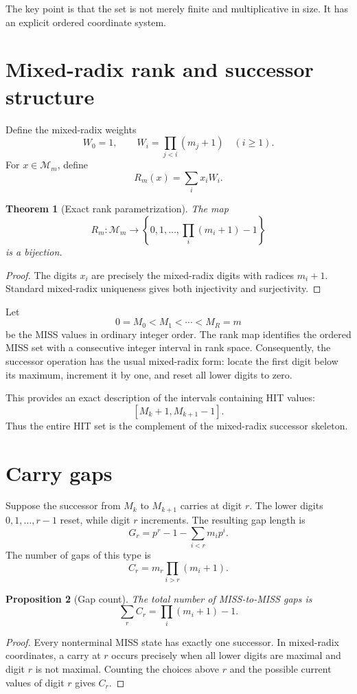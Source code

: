 \documentclass[11pt,a4paper]{article}
\newtheorem{theorem}{Theorem}[section]
\newtheorem{proposition}[theorem]{Proposition}
\theoremstyle{definition}
\theoremstyle{remark}
\newcommand{\Miss}{\mathcal M}
\begin{document}
The key point is that the set is not merely finite and multiplicative in size.  It has an explicit ordered coordinate system.

\section{Mixed-radix rank and successor structure}

Define the mixed-radix weights
\[
 W_0=1,
 \qquad
 W_i=\prod_{j<i}(m_j+1)
 \quad(i\ge1).
\]
For $x\in\Miss_m$, define
\[
 R_m(x)=\sum_i x_iW_i.
\]

\begin{theorem}[Exact rank parametrization]
The map
\[
 R_m:\Miss_m\longrightarrow
\left\{0,1,\ldots,
\prod_i(m_i+1)-1\right\}
\]
is a bijection.
\end{theorem}
\begin{proof}
The digits $x_i$ are precisely the mixed-radix digits with radices $m_i+1$.  Standard mixed-radix uniqueness gives both injectivity and surjectivity.
\end{proof}

Let
\[
 0=M_0<M_1<\cdots<M_R=m
\]
be the MISS values in ordinary integer order.  The rank map identifies the ordered MISS set with a consecutive integer interval in rank space.  Consequently, the successor operation has the usual mixed-radix form: locate the first digit below its maximum, increment it by one, and reset all lower digits to zero.

This provides an exact description of the intervals containing HIT values:
\[
 [M_k+1,M_{k+1}-1].
\]
Thus the entire HIT set is the complement of the mixed-radix successor skeleton.

\section{Carry gaps}

Suppose the successor from $M_k$ to $M_{k+1}$ carries at digit $r$.  The lower digits $0,1,\ldots,r-1$ reset, while digit $r$ increments.  The resulting gap length is
\[
 G_r
 =p^r-1-\sum_{i<r}m_i p^i.
\]
The number of gaps of this type is
\[
 C_r
 =m_r\prod_{i>r}(m_i+1).
\]

\begin{proposition}[Gap count]
The total number of MISS-to-MISS gaps is
\[
\sum_r C_r
 =
 \prod_i(m_i+1)-1.
\]
\end{proposition}
\begin{proof}
Every nonterminal MISS state has exactly one successor.  In mixed-radix coordinates, a carry at $r$ occurs precisely when all lower digits are maximal and digit $r$ is not maximal.  Counting the choices above $r$ and the possible current values of digit $r$ gives $C_r$.
\end{proof}
\end{document}
